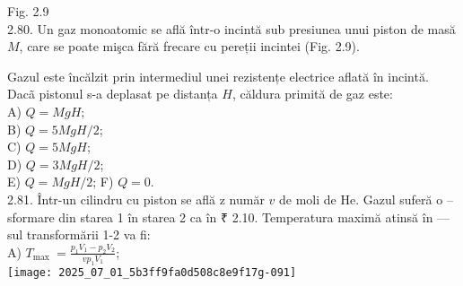 Fig. 2.9\\
2.80. Un gaz monoatomic se află într-o incintă sub presiunea unui piston de masă $M$, care se poate mişca fără frecare cu pereții incintei (Fig. 2.9).

Gazul este încălzit prin intermediul unei rezistențe electrice aflată în incintă. Dacã pistonul s-a deplasat pe distanța $H$, căldura primită de gaz este:\\
A) $Q=M g H$;\\
B) $Q=5 M g H / 2$;\\
C) $Q=5 M g H$;\\
D) $Q=3 M g H / 2$;\\
E) $Q=M g H / 2$; F) $Q=0$.\\
2.81. Într-un cilindru cu piston se află z număr $v$ de moli de He. Gazul suferă o --sformare din starea 1 în starea 2 ca în ₹ 2.10. Temperatura maximă atinsă în ---sul transformării 1-2 va fi:\\
A) $T_{\text {max }}=\frac{p_{1} V_{1}-p_{2} V_{2}}{v p_{1} V_{1}}$;\\
\texttt{[image: 2025\_07\_01\_5b3ff9fa0d508c8e9f17g-091]}

